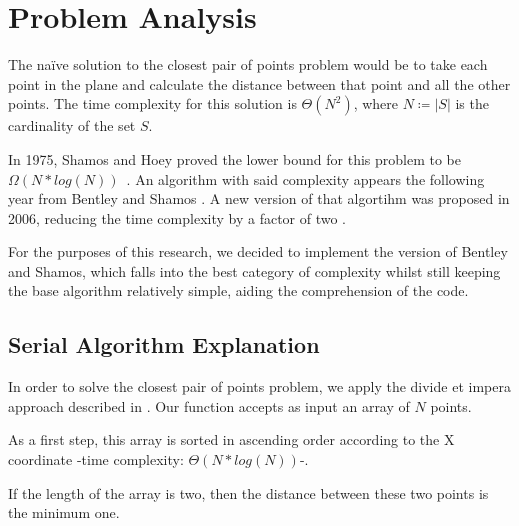 \section{Problem Analysis}
\label{sec:problem_analysis}

The na\"ive solution to the closest pair of points problem would be to take each point
in the plane and calculate the distance between that point and all
the other points. The time complexity for this solution is $\Theta(N^2)$,
where $N\coloneqq|S|$ is the cardinality of the set $S$.


In 1975, Shamos and Hoey proved the lower bound for this problem to be $\Omega(N * log(N))$~\cite[§2, theorem 1]{closest_pair_definition}. An algorithm with said complexity appears
the following year from Bentley and Shamos \cite{divide_and_conq_3NlgN}.
A new version of that algortihm was proposed in 2006, reducing the time complexity by a factor of two \cite{ge2006improved}.

For the purposes of this research, we decided to implement the version of Bentley and Shamos, which falls into the best category of complexity whilst still keeping the base algorithm relatively simple, aiding the comprehension of the code.

\subsection{Serial Algorithm Explanation}

In order to solve the closest pair of points problem, we apply the divide et impera approach described in \cite{divide_and_conq_3NlgN}.
Our function accepts as input an array of $N$ points.

As a first step, this array is sorted in ascending order according to the X coordinate -time complexity: $\Theta(N*log(N))$-.

If the length of the array is two, then the distance between these two points is the minimum one.

